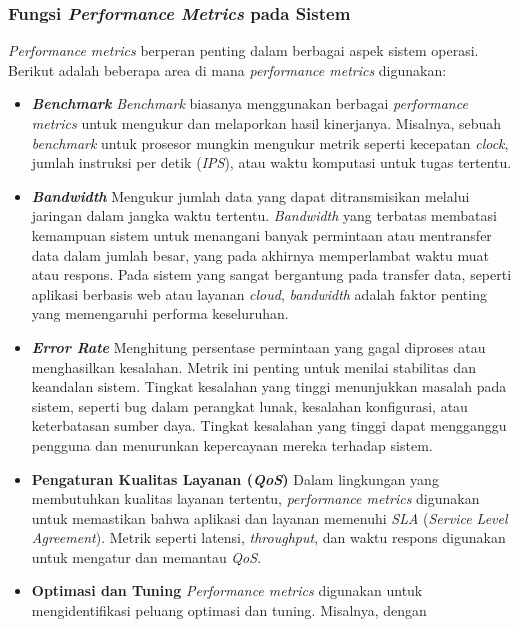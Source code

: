 \documentclass[12pt]{article}
\begin{document}
\subsubsection{Fungsi \textit{Performance Metrics} pada Sistem}
\hspace*{1cm} \textit{Performance metrics} berperan penting dalam berbagai aspek sistem operasi. Berikut adalah beberapa area di mana \textit{performance metrics} digunakan:
\begin{itemize}
    \item \textbf{\textit{Benchmark}} \newline
    \hspace*{1cm} \textit{Benchmark} biasanya menggunakan berbagai \textit{performance metrics} untuk mengukur dan melaporkan hasil kinerjanya. Misalnya, sebuah \textit{benchmark} untuk prosesor mungkin mengukur metrik seperti kecepatan \textit{clock}, jumlah instruksi per detik (\textit{IPS}), atau waktu komputasi untuk tugas tertentu.
    \item \textbf{\textit{Bandwidth}} \newline  
    \hspace*{1cm} Mengukur jumlah data yang dapat ditransmisikan melalui jaringan dalam jangka waktu tertentu. \textit{Bandwidth} yang terbatas membatasi kemampuan sistem untuk menangani banyak permintaan atau mentransfer data dalam jumlah besar, yang pada akhirnya memperlambat waktu muat atau respons. Pada sistem yang sangat bergantung pada transfer data, seperti aplikasi berbasis web atau layanan \textit{cloud}, \textit{bandwidth} adalah faktor penting yang memengaruhi performa keseluruhan.
    \item \textbf{\textit{Error Rate}} \newline  
    \hspace*{1cm} Menghitung persentase permintaan yang gagal diproses atau menghasilkan kesalahan. Metrik ini penting untuk menilai stabilitas dan keandalan sistem. Tingkat kesalahan yang tinggi menunjukkan masalah pada sistem, seperti bug dalam perangkat lunak, kesalahan konfigurasi, atau keterbatasan sumber daya. Tingkat kesalahan yang tinggi dapat mengganggu pengguna dan menurunkan kepercayaan mereka terhadap sistem.
    \item \textbf{Pengaturan Kualitas Layanan (\textit{QoS})} \newline  
    \hspace*{1cm} Dalam lingkungan yang membutuhkan kualitas layanan tertentu, \textit{performance metrics} digunakan untuk memastikan bahwa aplikasi dan layanan memenuhi \textit{SLA} (\textit{Service Level Agreement}). Metrik seperti latensi, \textit{throughput}, dan waktu respons digunakan untuk mengatur dan memantau \textit{QoS}.
    \item \textbf{Optimasi dan Tuning} \newline  
    \hspace*{1cm} \textit{Performance metrics} digunakan untuk mengidentifikasi peluang optimasi dan tuning. Misalnya, dengan
\end{itemize}
\end{document}
